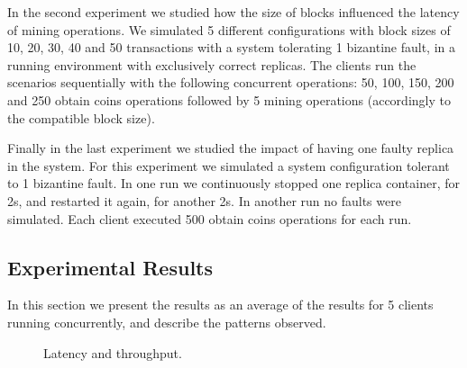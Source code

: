 \documentclass[10pt,journal,compsoc]{IEEEtran}
\begin{document}
	In the second experiment we studied how the size of blocks influenced the latency of mining operations. We simulated 5 different configurations with block sizes of 10, 20, 30, 40 and 50 transactions with a system tolerating 1 bizantine fault, in a running environment with exclusively correct replicas. The clients run the scenarios sequentially with the following concurrent operations: 50, 100, 150, 200 and 250 obtain coins operations followed by 5 mining operations (accordingly to the compatible block size).
	
	Finally in the last experiment we studied the impact of having one faulty replica in the system. For this experiment we simulated a system configuration tolerant to 1 bizantine fault. In one run we continuously stopped one replica container, for 2s, and restarted it again, for another 2s. In another run no faults were simulated. Each client executed 500 obtain coins operations for each run.
	
	
	\subsection{Experimental Results}
	
	In this section we present the results as an average of the results for 5 clients running concurrently, and describe the patterns observed.
		
	\begin{figure}[!ht]
		\centering
		\vfil
		\centering
		\caption{Latency and throughput.}
	\end{figure}
	
\end{document}

